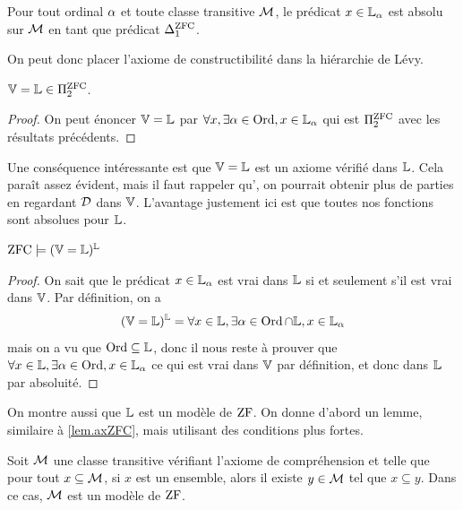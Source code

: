 \begin{corollary}
  Pour tout ordinal $\alpha$ et toute classe transitive $\mathcal{M}$, le
  prédicat $x\in \mathbb L_{\alpha}$ est absolu sur $\mathcal{M}$ en tant que prédicat
  $\Delta_{1}^{\operatorname{ZFC}}$.
\end{corollary}

\noindent
On peut donc placer l'axiome de constructibilité dans la hiérarchie de Lévy.

\begin{proposition}
  $\mathbb V = \mathbb L \in \Pi_{2}^{\operatorname{ZFC}}$.
\end{proposition}

\begin{proof}
  On peut énoncer $\mathbb V = \mathbb L$ par $\forall x, \exists \alpha \in \operatorname{Ord}, x\in \mathbb L_{\alpha}$
  qui est $\Pi_{2}^{\operatorname{ZFC}}$ avec les résultats précédents.
\end{proof}

Une conséquence intéressante est que $\mathbb V = \mathbb L$ est un axiome vérifié dans $\mathbb L$.
Cela paraît assez évident, mais il faut rappeler qu', on
pourrait obtenir plus de parties en regardant $\mathcal{D}$ dans $\mathbb V$.
L'avantage justement ici est que toutes nos fonctions sont absolues pour $\mathbb L$. 

\begin{theorem}
  $\operatorname{ZFC}\models (\mathbb V = \mathbb L)^{\mathbb L}$
\end{theorem}

\begin{proof}
  On sait que le prédicat $x\in \mathbb L_{\alpha}$ est vrai dans $\mathbb L$ si et seulement
  s'il est vrai dans $\mathbb V$. Par définition, on a
  \[(\mathbb V = \mathbb L)^{\mathbb L}= \forall x\in\mathbb L,\exists \alpha \in \operatorname{Ord}\cap \mathbb L,x\in \mathbb L_{\alpha}\]
  mais on a vu que $\operatorname{Ord}\subseteq \mathbb L$, donc il nous reste à prouver que
  $\forall x \in \mathbb L, \exists \alpha \in \operatorname{Ord}, x \in \mathbb L_{\alpha}$ ce qui est vrai dans
  $\mathbb V$ par définition, et donc dans $\mathbb L$ par absoluité.
\end{proof}

On montre aussi que $\mathbb L$ est un modèle de $\operatorname{ZF}$. On donne d'abord un
lemme, similaire à \cref{lem.axZFC}, mais utilisant des conditions plus fortes.

\begin{lemma}\label{lem.axZFC2}
  Soit $\mathcal{M}$ une classe transitive vérifiant l'axiome de compréhension et
  telle que pour tout $x \subseteq \mathcal{M}$, si $x$ est un ensemble, alors il
  existe $y \in \mathcal{M}$ tel que $x \subseteq y$. Dans ce cas, $\mathcal{M}$ est un
  modèle de $\operatorname{ZF}$.
\end{lemma}


